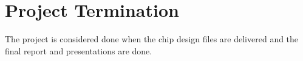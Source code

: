 \section{Project Termination}

The project is considered done when the chip design files are delivered and the final report and presentations are done.
